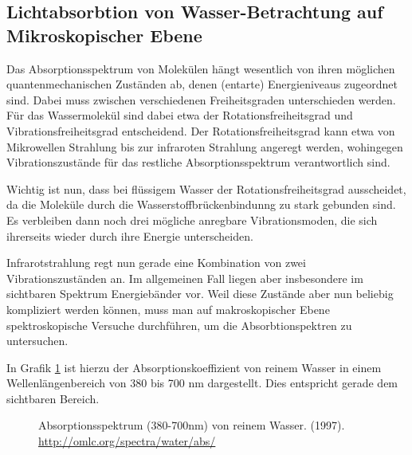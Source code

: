 \documentclass[12pt,a4paper,titlepage,headinclude,bibtotoc]{scrartcl}
\begin{document}
\subsection{Lichtabsorbtion von Wasser-Betrachtung auf Mikroskopischer Ebene}
Das Absorptionsspektrum von Molekülen hängt wesentlich von ihren möglichen 
quantenmechanischen Zuständen ab, denen (entarte) Energieniveaus zugeordnet sind. Dabei muss zwischen verschiedenen Freiheitsgraden
unterschieden werden. Für das Wassermolekül sind dabei etwa der Rotationsfreiheitsgrad und Vibrationsfreiheitsgrad entscheidend.
Der Rotationsfreiheitsgrad kann etwa von Mikrowellen Strahlung bis zur infraroten Strahlung angeregt werden, wohingegen Vibrationszustände für das restliche Absorptionsspektrum verantwortlich sind.


Wichtig ist nun, dass bei flüssigem Wasser der Rotationsfreiheitsgrad ausscheidet, da die Moleküle durch die Wasserstoffbrückenbindunng zu stark gebunden sind.
Es verbleiben dann noch drei mögliche anregbare Vibrationsmoden, die sich ihrerseits wieder durch ihre Energie unterscheiden.

Infrarotstrahlung regt nun gerade eine Kombination von zwei Vibrationszuständen an.
Im allgemeinen Fall liegen aber insbesondere im sichtbaren Spektrum Energiebänder vor.
Weil diese Zustände aber nun beliebig kompliziert werden können, muss man auf makroskopischer Ebene spektroskopische Versuche durchführen, um die Absorbtionspektren zu untersuchen.

In Grafik \ref{fig:abs} ist hierzu der Absorptionskoeffizient von reinem Wasser in einem Wellenlängenbereich von 380 bis 700 nm dargestellt.
Dies entspricht gerade dem sichtbaren Bereich.

\cite{abs}

\begin{figure}[h]
	\centering
	
	\caption{Absorptionsspektrum (380-700nm) von reinem Wasser. (1997). \url{http://omlc.org/spectra/water/abs/}}
	\label{fig:abs}
\end{figure}
\end{document}
